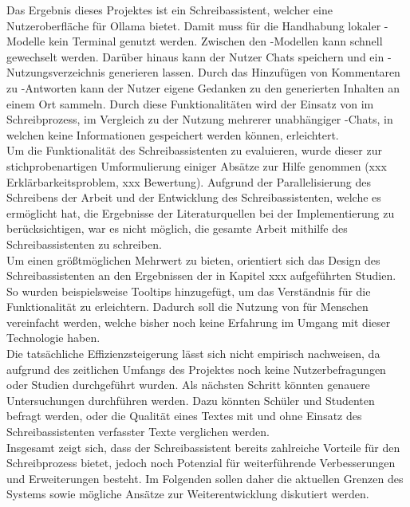 \documentclass[../main.tex]{subfiles}
\begin{document}
Das Ergebnis dieses Projektes ist ein Schreibassistent, welcher eine Nutzeroberfläche für Ollama bietet. Damit muss für die Handhabung lokaler -Modelle kein Terminal genutzt werden. 
Zwischen den -Modellen kann schnell gewechselt werden. Darüber hinaus kann der Nutzer Chats speichern und ein -Nutzungsverzeichnis generieren lassen. Durch das Hinzufügen von Kommentaren 
zu -Antworten kann der Nutzer eigene Gedanken zu den generierten Inhalten an einem Ort sammeln. Durch diese Funktionalitäten wird der Einsatz von  im Schreibprozess, im Vergleich 
zu der Nutzung mehrerer unabhängiger -Chats, in welchen keine Informationen gespeichert werden können, erleichtert.\\ 
Um die Funktionalität des Schreibassistenten zu evaluieren, wurde dieser zur stichprobenartigen Umformulierung einiger Absätze zur Hilfe genommen (xxx Erklärbarkeitsproblem, xxx 
Bewertung). Aufgrund der Parallelisierung des Schreibens der Arbeit und der Entwicklung des Schreibassistenten, welche es ermöglicht hat, die Ergebnisse der Literaturquellen bei der 
Implementierung zu berücksichtigen, war es nicht möglich, die gesamte Arbeit mithilfe des Schreibassistenten zu schreiben. \\
Um einen größtmöglichen Mehrwert zu bieten, orientiert sich das Design des Schreibassistenten an den Ergebnissen der in Kapitel xxx aufgeführten Studien. So wurden beispielsweise 
Tooltips hinzugefügt, um das Verständnis für die Funktionalität zu erleichtern. Dadurch soll die Nutzung von  für Menschen vereinfacht werden, welche bisher noch keine Erfahrung im 
Umgang mit dieser Technologie haben.\\
Die tatsächliche Effizienzsteigerung lässt sich nicht empirisch nachweisen, da aufgrund des zeitlichen Umfangs des Projektes noch keine Nutzerbefragungen oder Studien durchgeführt 
wurden. Als nächsten Schritt könnten genauere Untersuchungen durchführen werden. Dazu könnten Schüler und Studenten befragt werden, oder die Qualität eines Textes mit und ohne 
Einsatz des Schreibassistenten verfasster Texte verglichen werden.\\ 
Insgesamt zeigt sich, dass der Schreibassistent bereits zahlreiche Vorteile für den Schreibprozess bietet, jedoch noch Potenzial für weiterführende Verbesserungen und Erweiterungen 
besteht. Im Folgenden sollen daher die aktuellen Grenzen des Systems sowie mögliche Ansätze zur Weiterentwicklung diskutiert werden.\\
\end{document}

